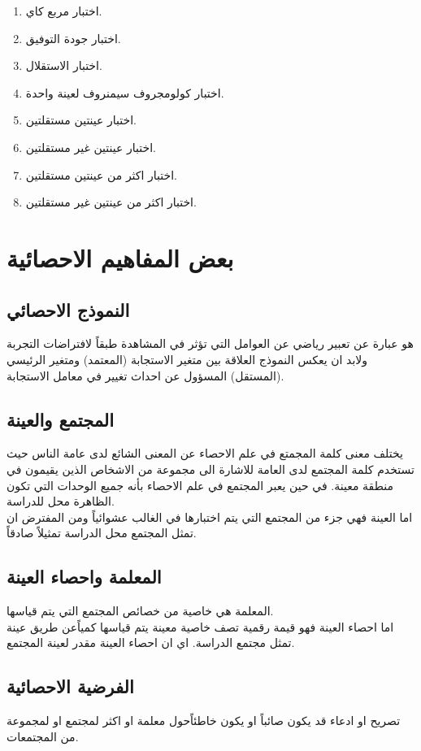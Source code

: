 \begin{enumerate}
	\item اختبار مربع كاي.
	\item اختبار جودة التوفيق.
	\item اختبار الاستقلال.
	\item اختبار كولومجروف سيمنروف لعينة واحدة.
	\item اختبار عينتين مستقلتين.
	\item اختبار عينتين غير مستقلتين.
	\item اختبار اكثر من عينتين مستقلتين.
	\item اختبار اكثر من عينتين غير مستقلتين.
\end{enumerate}

\section{بعض المفاهيم الاحصائية}

\subsection{النموذج الاحصائي}
هو عبارة عن تعبير رياضي عن العوامل التي تؤثر في المشاهدة طبقاً لافتراضات التجربة ولابد ان يعكس النموذج العلاقة بين متغير الاستجابة (المعتمد) ومتغير الرئيسي (المستقل) المسؤول عن احداث تغيير في معامل الاستجابة.

\subsection{المجتمع والعينة}
يختلف معنى كلمة المجمتع في علم الاحصاء عن المعنى الشائع لدى عامة الناس حيث تستخدم كلمة المجتمع لدى العامة للاشارة الى مجموعة من الاشخاص الذين يقيمون في منطقة معينة. في حين يعبر المجتمع في علم الاحصاء بأنه جميع الوحدات التي تكون الظاهرة محل للدراسة.\\
\noindent
اما العينة فهي جزء من المجتمع التي يتم اختبارها في الغالب عشوائياً ومن المفترض ان تمثل المجتمع محل الدراسة تمثيلاً صادقاً.

\subsection{المعلمة واحصاء العينة}
المعلمة هي خاصية من خصائص المجتمع التي يتم قياسها.\\
اما احصاء العينة فهو قيمة رقمية تصف خاصية معينة يتم قياسها كمياًعن طريق عينة تمثل مجتمع الدراسة. اي ان احصاء العينة مقدر لعينة المجتمع.

\subsection{الفرضية الاحصائية}
تصريح او ادعاء قد يكون صائباً او يكون خاطئاًحول معلمة او اكثر لمجتمع او لمجموعة من المجتمعات.

